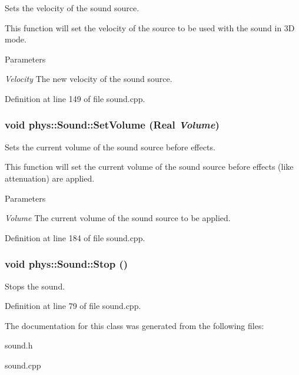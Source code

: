 Sets the velocity of the sound source. 

This function will set the velocity of the source to be used with the sound in 3D mode. 
\begin{DoxyParams}{Parameters}
\item[{\em Velocity}]The new velocity of the sound source. \end{DoxyParams}


Definition at line 149 of file sound.cpp.

\hypertarget{classphys_1_1Sound_a62438fb7916e1e7e9abe66722de83821}{
\subsubsection[{SetVolume}]{\setlength{\rightskip}{0pt plus 5cm}void phys::Sound::SetVolume ({\bf Real} {\em Volume})}}
\label{dc/d2f/classphys_1_1Sound_a62438fb7916e1e7e9abe66722de83821}


Sets the current volume of the sound source before effects. 

This function will set the current volume of the sound source before effects (like attenuation) are applied. 
\begin{DoxyParams}{Parameters}
\item[{\em Volume}]The current volume of the sound source to be applied. \end{DoxyParams}


Definition at line 184 of file sound.cpp.

\hypertarget{classphys_1_1Sound_a662d760ec0e6214537b13810a8ac9955}{
\subsubsection[{Stop}]{\setlength{\rightskip}{0pt plus 5cm}void phys::Sound::Stop ()}}
\label{dc/d2f/classphys_1_1Sound_a662d760ec0e6214537b13810a8ac9955}
Stops the sound. 

Definition at line 79 of file sound.cpp.



The documentation for this class was generated from the following files:\begin{DoxyCompactItemize}
\item 
sound.h\item 
sound.cpp\end{DoxyCompactItemize}
